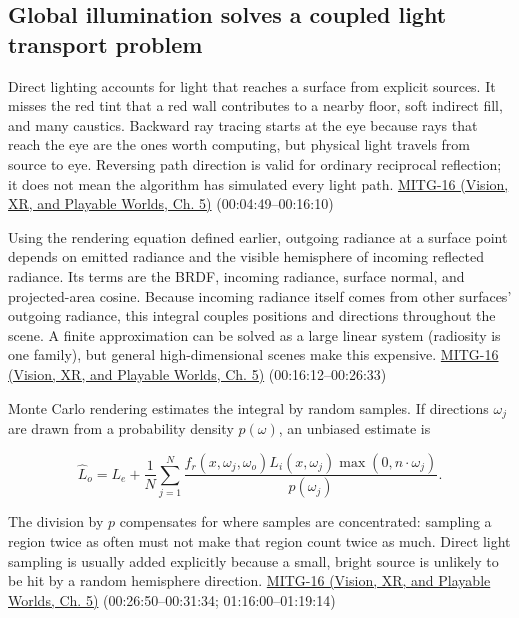 \subsection{Global illumination solves a coupled light transport problem}\label{03-visual-computing-i-ch011-global-illumination-solves-a-coupled-light-transport-problem}

\hypertarget{03-visual-computing-i-ch011-global-illumination-solves-a-coupled-light-transport-problem}{}

Direct lighting accounts for light that reaches a surface from explicit sources. It misses the red tint that a red wall contributes to a nearby floor, soft indirect fill, and many caustics. Backward ray tracing starts at the eye because rays that reach the eye are the ones worth computing, but physical light travels from source to eye. Reversing path direction is valid for ordinary reciprocal reflection; it does not mean the algorithm has simulated every light path. \href{../07-Vision-XR-and-Playable-Worlds/main.pdf\#nameddest=04-visual-computing-ii-ch036-mitg-16---global-illumination}{MITG-16 (Vision, XR, and Playable Worlds, Ch. 5)} (00:04:49--00:16:10)

Using the rendering equation defined earlier, outgoing radiance at a surface point depends on emitted radiance and the visible hemisphere of incoming reflected radiance. Its terms are the BRDF, incoming radiance, surface normal, and projected-area cosine. Because incoming radiance itself comes from other surfaces' outgoing radiance, this integral couples positions and directions throughout the scene. A finite approximation can be solved as a large linear system (radiosity is one family), but general high-dimensional scenes make this expensive. \href{../07-Vision-XR-and-Playable-Worlds/main.pdf\#nameddest=04-visual-computing-ii-ch036-mitg-16---global-illumination}{MITG-16 (Vision, XR, and Playable Worlds, Ch. 5)} (00:16:12--00:26:33)

Monte Carlo rendering estimates the integral by random samples. If directions \(\omega_j\) are drawn from a probability density \(p(\omega)\), an unbiased estimate is

\[
\widehat L_o=L_e+\frac1N\sum_{j=1}^{N}\frac{f_r(x,\omega_j,\omega_o)L_i(x,\omega_j)\max(0,n\cdot\omega_j)}{p(\omega_j)}.
\]

The division by \(p\) compensates for where samples are concentrated: sampling a region twice as often must not make that region count twice as much. Direct light sampling is usually added explicitly because a small, bright source is unlikely to be hit by a random hemisphere direction. \href{../07-Vision-XR-and-Playable-Worlds/main.pdf\#nameddest=04-visual-computing-ii-ch036-mitg-16---global-illumination}{MITG-16 (Vision, XR, and Playable Worlds, Ch. 5)} (00:26:50--00:31:34; 01:16:00--01:19:14)

